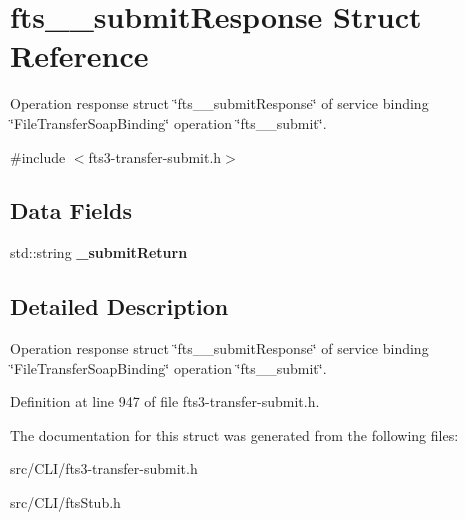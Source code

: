 \section{fts\_\-\_\-submitResponse Struct Reference}
\label{structfts____submitResponse}


Operation response struct \char`\"{}fts\_\-\_\-submitResponse\char`\"{} of service binding \char`\"{}FileTransferSoapBinding\char`\"{} operation \char`\"{}fts\_\-\_\-submit\char`\"{}.  




{\ttfamily \#include $<$fts3-\/transfer-\/submit.h$>$}

\subsection*{Data Fields}
\begin{DoxyCompactItemize}
\item 
std::string {\bfseries \_\-submitReturn}\label{structfts____submitResponse_a7ae4632b696a372f085b2aaed2470892}

\end{DoxyCompactItemize}


\subsection{Detailed Description}
Operation response struct \char`\"{}fts\_\-\_\-submitResponse\char`\"{} of service binding \char`\"{}FileTransferSoapBinding\char`\"{} operation \char`\"{}fts\_\-\_\-submit\char`\"{}. 

Definition at line 947 of file fts3-\/transfer-\/submit.h.



The documentation for this struct was generated from the following files:\begin{DoxyCompactItemize}
\item 
src/CLI/fts3-\/transfer-\/submit.h\item 
src/CLI/ftsStub.h\end{DoxyCompactItemize}
